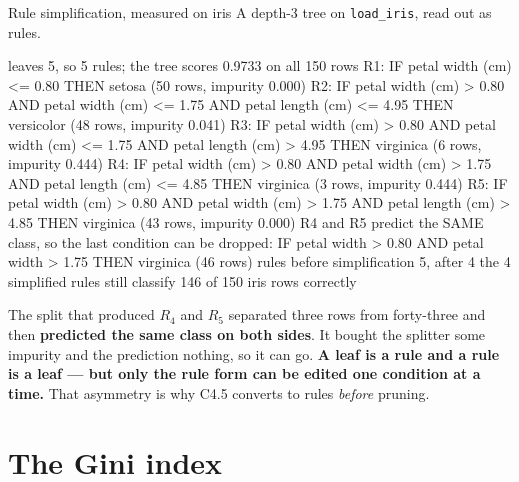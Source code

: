 \documentclass[aspectratio=169]{beamer}
\begin{document}
\begin{frame}[fragile,shrink=10]{Rule simplification, measured on iris}
A depth-3 tree on \texttt{load\_iris}, read out as rules.
\begin{outblk}
leaves 5, so 5 rules; the tree scores 0.9733 on all 150 rows
R1: IF petal width (cm) <= 0.80 THEN setosa   (50 rows, impurity 0.000)
R2: IF petal width (cm) > 0.80 AND petal width (cm) <= 1.75 AND petal length (cm) <= 4.95 THEN versicolor   (48 rows, impurity 0.041)
R3: IF petal width (cm) > 0.80 AND petal width (cm) <= 1.75 AND petal length (cm) > 4.95 THEN virginica   (6 rows, impurity 0.444)
R4: IF petal width (cm) > 0.80 AND petal width (cm) > 1.75 AND petal length (cm) <= 4.85 THEN virginica   (3 rows, impurity 0.444)
R5: IF petal width (cm) > 0.80 AND petal width (cm) > 1.75 AND petal length (cm) > 4.85 THEN virginica   (43 rows, impurity 0.000)
R4 and R5 predict the SAME class, so the last condition can be dropped:
   IF petal width > 0.80 AND petal width > 1.75 THEN virginica  (46 rows)
rules before simplification 5, after 4
the 4 simplified rules still classify 146 of 150 iris rows correctly
\end{outblk}
\begin{center}\small
  The split that produced $R_4$ and $R_5$ separated three rows from
  forty-three and then \textbf{predicted the same class on both sides}. It
  bought the splitter some impurity and the prediction nothing, so it can go.
  \textbf{A leaf is a rule and a rule is a leaf --- but only the rule form can
  be edited one condition at a time.} That asymmetry is why C4.5 converts to
  rules \emph{before} pruning.
\end{center}
\end{frame}

\section[Gini]{The Gini index}
\label{sec:gini}
\end{document}

